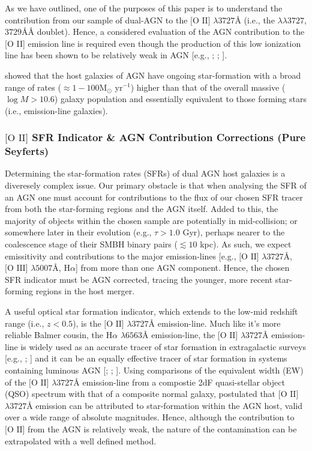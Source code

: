 As we have outlined, one of the purposes of this paper is to understand the contribution from our sample of dual-AGN to the $\text{[O II]}$ $\lambda{3727}Å$ (i.e., the $\lambda\lambda{3727}$,$3729ÅÅ$ doublet). Hence, a considered evaluation of the AGN contribution to the [O II] emission line is required even though the production of this low ionization line has been shown to be relatively weak in AGN [e.g., \cite{Ferland_1986}; \cite{Ho_1993}; \cite{2006ApJ...642..702K}]. 

\cite{2009ApJ...696..396S} showed that the host galaxies of AGN have ongoing star-formation with a broad range of rates ($\approx{1-100}$M$_{\odot}$ yr$^{-1}$) higher than that of the overall massive ($\log{M}>{10.6}$) galaxy population and essentially equivalent to those forming stars (i.e., emission-line galaxies).

\subsubsection{${\text{[O II]}}$ SFR Indicator \& AGN Contribution Corrections (Pure Seyferts)}

Determining the star-formation rates (SFRs) of dual AGN host galaxies is a diveresely complex issue. Our primary obstacle is that when analysing the SFR of an AGN one must account for contributions to the flux of our chosen SFR tracer from both the star-forming regions and the AGN itself. Added to this, the majority of objects within the chosen sample are potentially in mid-collision; or somewhere later in their evolution (e.g., ${\tau}>{1.0}$ Gyr), perhaps nearer to the coalescence stage of their SMBH binary pairs ($\lesssim{10}$ kpc). As such, we expect emissitivity and contributions to the major emission-lines [e.g., $\text{[O II]}$ $\lambda{3727}Å$, $\text{[O III]}$ $\lambda{5007}Å$, $\text{H}\alpha$] from more than one AGN component. Hence, the chosen SFR indicator must be AGN corrected, tracing the younger, more recent star-forming regions in the host merger. 

A useful optical star formation indicator, which extends to the low-mid redshift range (i.e., ${z}<{0.5}$), is the $\text{[O II]}$ $\lambda{3727}Å$ emission-line. Much like it's more reliable Balmer cousin, the $\text{H}\alpha$ $\lambda 6563Å$ emission-line, the $\text{[O II]}$ $\lambda{3727}Å$ emission-line is widely used as an accurate tracer of star formation in extragalactic surveys [e.g., \cite{Lilly_1996}; \cite{Hippelein_2003}] and it can be an equally effective tracer of star formation in systems containing luminous AGN [\cite{2006ApJ...642..702K}; \cite{2009ApJ...696..396S}; \cite{2012MNRAS.427.2401K}]. Using comparisons of the equivalent width (EW) of the $\text{[O II]}$  $\lambda{3727}Å$ emission-line from a compostie 2dF quasi-stellar object (QSO) spectrum with that of a composite normal galaxy, \cite{2002MNRAS.337..275C} postulated that $\text{[O II]}$ $\lambda{3727}Å$ emission can be attributed to star-formation within the AGN host, valid over a wide range of absolute magnitudes. Hence, although the contribution to $\text{[O II]}$ from the AGN is relatively weak, the nature of the contamination can be extrapolated with a well defined method.   


